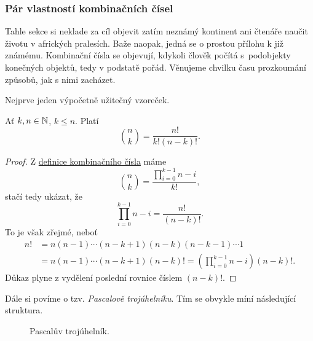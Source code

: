 \subsubsection{Pár vlastností kombinačních čísel}
\label{sssec:par-vlastnosti-kombinacnich-cisel}

Tahle sekce si neklade za cíl objevit zatím neznámý kontinent ani čtenáře naučit
životu v afrických pralesích. Baže naopak, jedná se o prostou přílohu k již
známému. Kombinační čísla se objevují, kdykoli člověk počítá s~podobjekty
konečných objektů, tedy v podstatě pořád. Věnujeme chvilku času prozkoumání
způsobů, jak s nimi zacházet.

Nejprve jeden výpočetně užitečný vzoreček.

\begin{lemma}
 \label{lem:vzorec-pro-kombinacni-cislo}
 Ať $k,n \in \mathbb{N}$, $k \leq n$. Platí
 \[
  \binom{n}{k} = \frac{n!}{k!(n-k)!}.
 \]
\end{lemma}
\begin{proof}
 Z \hyperref[def:kombinacni-cislo]{definice kombinačního čísla} máme
 \[
  \binom{n}{k} = \frac{\prod_{i=0}^{k-1} n-i}{k!},
 \]
 stačí tedy ukázat, že
 \[
  \prod_{i=0}^{k-1} n - i = \frac{n!}{(n-k)!}.
 \]
 To je však zřejmé, neboť
 \begin{align*}
  n! &= n(n-1) \cdots (n-k+1)(n-k)(n-k-1) \cdots 1\\
  &= n(n-1)\cdots (n-k+1)(n-k)! = \left( \prod_{i=0}^{k-1} n-i \right)(n-k)!.
 \end{align*}
 Důkaz plyne z vydělení poslední rovnice číslem $(n-k)!$.
\end{proof}

Dále si povíme o tzv. \emph{Pascalově trojúhelníku}. Tím se obvykle míní
následující struktura.

\begin{figure}[h]
 \centering
 \caption{Pascalův trojúhelník.}
 \label{fig:pascaluv-trojuhelnik}
\end{figure}


